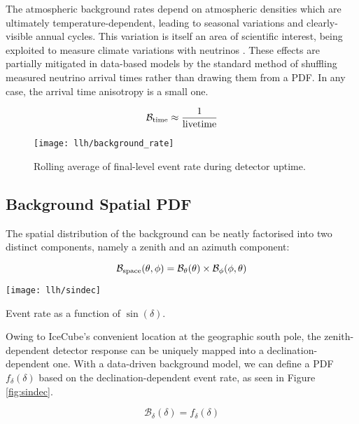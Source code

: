The atmospheric background rates depend on atmospheric densities which are ultimately temperature-dependent, leading to seasonal variations and clearly-visible annual cycles. This variation is itself an area of scientific interest, being exploited to measure climate variations with neutrinos . These effects are partially mitigated in data-based models by the standard method of shuffling measured neutrino arrival times rather than drawing them from a PDF. In any case, the arrival time anisotropy is a small one.

\begin{equation}
\mathcal{B}_{\textup{time}} \approx \frac{1}{\textup{livetime}}
\end{equation}

\begin{figure}[!ht]
	\centering \texttt{[image: llh/background\_rate]}
	\caption{Rolling average of final-level event rate during detector uptime.}
	\label{fig:background_rate}
\end{figure}

\subsection*{Background Spatial PDF}

The spatial distribution of the background can be neatly factorised into two distinct components, namely a zenith and an azimuth component:

\begin{equation}
	\mathcal{B}_{\textup{space}} (\theta, \phi) = \mathcal{B}_{\theta}(\theta) \times \mathcal{B}_{\phi}(\phi, \theta)
	\label{eq:b_space_local}
\end{equation}


\begin{marginfigure}
	\centering \texttt{[image: llh/sindec]}
	\caption{Event rate as a function of $\sin(\delta)$.}
	\label{fig:sindec}
\end{marginfigure}

Owing to IceCube's convenient location at the geographic south pole, the zenith-dependent detector response can be uniquely mapped into a declination-dependent one. With a data-driven background model, we can define a PDF $f_{\delta}(\delta)$ based on the declination-dependent event rate, as seen in Figure \ref{fig:sindec}.

\begin{equation}
	\mathcal{B}_{\delta}(\delta) = f_{\delta}(\delta)
	\label{eq:b_theta}
\end{equation}

